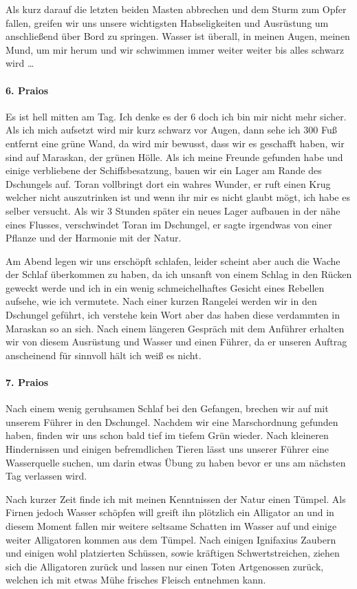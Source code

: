 Als kurz darauf die letzten beiden Masten abbrechen und dem Sturm zum Opfer fallen, greifen wir uns unsere wichtigsten Habseligkeiten und Ausrüstung um anschließend über Bord zu springen. Wasser ist überall, in meinen Augen, meinen Mund, um mir herum und wir schwimmen immer weiter weiter bis alles schwarz wird \dots

\paragraph{6. Praios}
Es ist hell mitten am Tag. Ich denke es der 6 doch ich bin mir nicht mehr sicher.
Als ich mich aufsetzt wird mir kurz schwarz vor Augen, dann sehe ich 300 Fuß entfernt eine grüne Wand, da wird mir bewusst, dass wir es geschafft haben, wir sind auf Maraskan, der grünen Hölle. Als ich meine Freunde gefunden habe und einige verbliebene der Schiffsbesatzung, bauen wir ein Lager am Rande des Dschungels auf. Toran vollbringt dort ein wahres Wunder, er ruft einen Krug welcher nicht auszutrinken ist und wenn ihr mir es nicht glaubt mögt, ich habe es selber versucht. Als wir 3 Stunden später ein neues Lager aufbauen in der nähe eines Flusses, verschwindet Toran im Dschungel, er sagte irgendwas von einer Pflanze und der Harmonie mit der Natur.

Am Abend legen wir uns erschöpft schlafen, leider scheint aber auch die Wache der Schlaf überkommen zu haben, da ich unsanft von einem Schlag in den Rücken geweckt werde und ich in ein wenig schmeichelhaftes Gesicht eines Rebellen aufsehe, wie ich vermutete. Nach einer kurzen Rangelei werden wir in den Dschungel geführt, ich verstehe kein Wort aber das haben diese verdammten in Maraskan so an sich. Nach einem längeren Gespräch mit dem Anführer erhalten wir von diesem Ausrüstung und Wasser und einen Führer, da er unseren Auftrag anscheinend für sinnvoll hält ich weiß es nicht.

\paragraph{7. Praios}
Nach einem wenig geruhsamen Schlaf bei den Gefangen, brechen wir auf mit unserem Führer in den Dschungel. Nachdem wir eine Marschordnung gefunden haben, finden wir uns schon bald tief im tiefem Grün wieder. Nach kleineren Hindernissen und einigen befremdlichen Tieren lässt uns unserer Führer eine Wasserquelle suchen, um darin etwas Übung zu haben bevor er uns am nächsten Tag verlassen wird. 

Nach kurzer Zeit finde ich mit meinen Kenntnissen der Natur einen Tümpel. Als Firnen jedoch Wasser schöpfen will greift ihn plötzlich ein Alligator an und in diesem Moment fallen mir weitere seltsame Schatten im Wasser auf und einige weiter Alligatoren kommen aus dem Tümpel. Nach einigen Ignifaxius Zaubern und einigen wohl platzierten Schüssen, sowie kräftigen Schwertstreichen, ziehen sich die Alligatoren zurück und lassen nur einen Toten Artgenossen zurück, welchen ich mit etwas Mühe frisches Fleisch entnehmen kann. 

